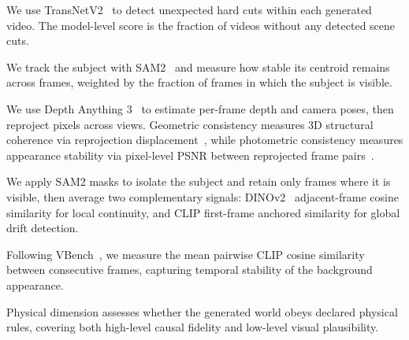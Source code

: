 We use TransNetV2~\cite{soucek2020transnet} to detect unexpected hard cuts within each generated video.
The model-level score is the fraction of videos without any detected scene cuts.

We track the subject with SAM2~\cite{ravi2024sam2} and measure how stable its centroid remains across frames, weighted by the fraction of frames in which the subject is visible.

We use Depth Anything 3~\cite{lin2025depthanything3} to estimate per-frame depth and camera poses, then reproject pixels across views.
Geometric consistency measures 3D structural coherence via reprojection displacement~\cite{an2026vggrpo}, while photometric consistency measures appearance stability via pixel-level PSNR between reprojected frame pairs~\cite{du2026videogpa}.

We apply SAM2 masks to isolate the subject and retain only frames where it is visible, then average two complementary signals: DINOv2~\cite{oquab2024dinov2} adjacent-frame cosine similarity for local continuity, and CLIP first-frame anchored similarity for global drift detection.

Following VBench~\cite{huang2024vbench}, we measure the mean pairwise CLIP cosine similarity between consecutive frames, capturing temporal stability of the background appearance.


\vspace{1mm}
Physical dimension assesses whether the generated world obeys declared physical rules, covering both high-level causal fidelity and low-level visual plausibility.

